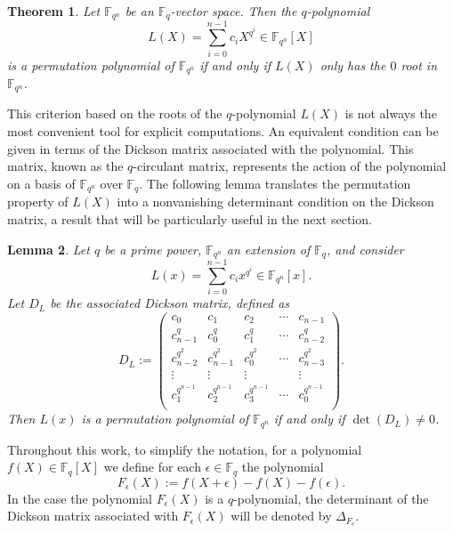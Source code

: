 \documentclass[12pt]{amsart}
\newtheorem{theorem}{Theorem}[section]
\newtheorem{lemma}[theorem]{Lemma}
\begin{document}
	\begin{theorem}\cite[Th. 7.9]{finite}
		Let $\mathbb{F}_{q^n}$ be an $\mathbb{F}_q$-vector space. Then the $q$-polynomial
		$$
		\displaystyle L(X) = \sum_{i=0}^{n-1} c_i X^{q^i} \in \mathbb{F}_{q^n}[X] 
		$$
		is a permutation polynomial of $\mathbb{F}_{q^n}$ if and only if $L(X)$ only has the $0$ root in $\mathbb{F}_{q^n}$.
	\end{theorem}
	
This criterion based on the roots of the $q$-polynomial $
	\displaystyle L(X)
	$ is not always the most convenient tool for explicit computations. An equivalent condition can be given in terms of the Dickson matrix associated with the polynomial. This matrix, known as the $q$-circulant matrix, represents the action of the polynomial on a basis of $\mathbb{F}_{q^n}$ over $\mathbb{F}_q$. The following lemma translates the permutation property of   $
	\displaystyle L(X)
	$ into a nonvanishing determinant condition on the Dickson matrix, a result that will be particularly useful in the next section.

	
	\begin{lemma}\cite[p. 362]{finite}\label{LemmaLinearized}
		Let $q$ be a prime power, $\mathbb{F}_{q^n}$ an extension of $\mathbb{F}_{q}$, and consider
		$$L(x)=\sum_{i=0}^{n-1} c_i x^{q^i}\in \mathbb{F}_{q^n}[x].$$
		Let $D_L$ be the associated Dickson matrix, defined as
		$$D_L:=
		\left(
		\begin{array}{cccccc}
			c_0&c_1&c_2&\cdots&c_{n-1}\\
			c_{n-1}^q&c_0^q&c_1^q&\cdots&c_{n-2}^q\\
			c_{n-2}^{q^2}&c_{n-1}^{q^2}&c_0^{q^2}&\cdots&c_{n-3}^{q^2}\\
			\vdots&\vdots&\vdots&&\vdots\\
			c_{1}^{q^{n-1}}&c_{2}^{q^{n-1}}&c_3^{q^{n-1}}&\cdots&c_{0}^{q^{n-1}}\\
		\end{array}
		\right).
		$$ Then $L(x)$ is a permutation polynomial of $\mathbb{F}_{q^n}$ if and only if 
		$\det(D_L) \neq 0$.
	\end{lemma}	
	
	Throughout this work, to simplify the notation, for a polynomial $f(X) \in \mathbb{F}_q[X]$ we define for each $\epsilon \in \mathbb{F}_q$ the polynomial 
	\[
	F_{\epsilon}(X) := f(X+\epsilon) - f(X) - f(\epsilon).
	\] 
	In the case the polynomial $F_{\epsilon}(X)  $ is a $q$-polynomial, the determinant of the Dickson matrix associated with $F_{\epsilon}(X)$ will be denoted by $\Delta_{F_{\epsilon}}$.
	
\end{document}
